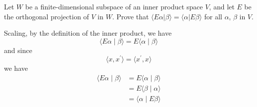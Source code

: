 \documentclass[11pt]{article}
\begin{document}
\pagebreak

\begin{homeworkProblem}

    Let $W$ be a finite-dimensional subspace of an inner product space $V$, and let $E$ be the orthogonal projection
    of $V$ in $W$. Prove that $\langle E\alpha | \beta \rangle = \langle \alpha | E \beta \rangle$ for all $\alpha$, $\beta$ in $V$. \\

    \solution

    Scaling, by the definition of the inner product, we have
    \[
        \langle E\alpha \mid \beta \rangle = E \langle \alpha \mid \beta \rangle
    \]
    and since
    \[
        \langle x, x^{\prime} \rangle = \langle x^{\prime} , x \rangle
    \]
    we have
    \begin{align*}
        \langle E\alpha \mid \beta \rangle & = E \langle \alpha \mid \beta \rangle  \\
                                           & = E \langle \beta  \mid \alpha \rangle \\
                                           & = \langle \alpha \mid E \beta \rangle
    \end{align*}

\end{homeworkProblem}
\end{document}
